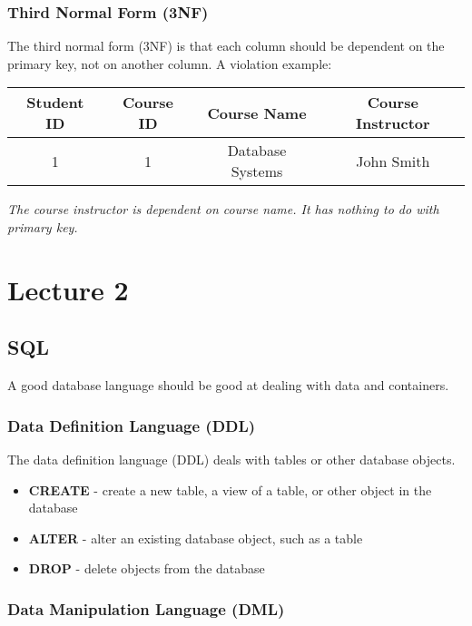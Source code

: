 \documentclass[a4paper,12pt]{article}
\begin{document}
\subsubsection{Third Normal Form (3NF)}

The third normal form (3NF) is that each column should be dependent on the primary key, not on another column.
A violation example:
\begin{center}
	\begin{tabular}{|c|c|c|c|}
		\hline
		\textbf{Student ID} & \textbf{Course ID} & \textbf{Course Name} & \textbf{Course Instructor} \\
		\hline
		1 & 1 & Database Systems & John Smith \\
		\hline
	\end{tabular}
\end{center}
\textit{The course instructor is dependent on course name. It has nothing to do with primary key.}

\section{Lecture 2}

\subsection{SQL}

A good database language should be good at dealing with data and containers.

\subsubsection{Data Definition Language (DDL)}

The data definition language (DDL) deals with tables or other database objects.

\begin{itemize}
	\item \textbf{CREATE} - create a new table, a view of a table, or other object in the database
	\item \textbf{ALTER} - alter an existing database object, such as a table
	\item \textbf{DROP} - delete objects from the database
\end{itemize}

\subsubsection{Data Manipulation Language (DML)}
\end{document}

